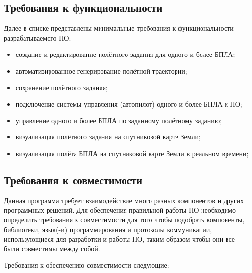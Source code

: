 \documentclass[specification,annotation]{itmo-student-thesis}
\begin{document}
\subsection{Требования к функциональности}

Далее в списке представлены минимальные требования к функциональности
разрабатываемого ПО:

\begin{itemize}
  \item создание и редактирование полётного задания для одного и более БПЛА;
  \item автоматизированное генерирование полётной траектории;
  \item сохранение полётного задания;
  \item подключение системы управления (автопилот) одного и более БПЛА к ПО;
  \item управление одного и более БПЛА по заданному полётному заданию;
  \item визуализация полётного задания на спутниковой карте Земли;
  \item визуализация полёта БПЛА на спутниковой карте Земли в реальном времени;
\end{itemize}

\subsection{Требования к совместимости}

Данная программа требует взаимодействие много разных компонентов и других
программных решений. Для обеспечения правильной работы ПО необходимо определить
требования к совместимости для того чтобы подобрать компоненты, библиотеки,
язык(-и) программирования и протоколы коммуникации, использующиеся для
разработки и работы ПО, таким образом чтобы они все были совместимы между собой.

Требования к обеспечению совместимости следующие:
\end{document}
